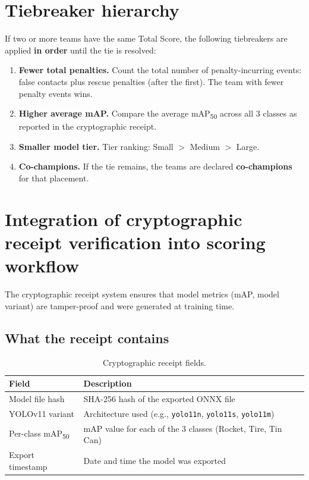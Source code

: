 \documentclass[a4]{article}
\begin{document}
\section*{Tiebreaker hierarchy}
If two or more teams have the same Total Score, the following tiebreakers are applied \textbf{in order} until the tie is resolved:

\begin{enumerate}
    \item \textbf{Fewer total penalties.} Count the total number of penalty-incurring events: false contacts plus rescue penalties (after the first). The team with fewer penalty events wins.

    \item \textbf{Higher average mAP.} Compare the average mAP\textsubscript{50} across all 3 classes as reported in the cryptographic receipt.

    \item \textbf{Smaller model tier.} Tier ranking: Small $>$ Medium $>$ Large.

    \item \textbf{Co-champions.} If the tie remains, the teams are declared \textbf{co-champions} for that placement.
\end{enumerate}

\section*{Integration of cryptographic receipt verification into scoring workflow}
The cryptographic receipt system ensures that model metrics (mAP, model variant) are tamper-proof and were generated at training time.

\subsection*{What the receipt contains}

\begin{table}[H]
\centering
\begin{tabular}{ll}
\toprule
\textbf{Field} & \textbf{Description} \\
\midrule
Model file hash & SHA-256 hash of the exported ONNX file \\
YOLOv11 variant & Architecture used (e.g., \texttt{yolo11n}, \texttt{yolo11s}, \texttt{yolo11m}) \\
Per-class mAP\textsubscript{50} & mAP value for each of the 3 classes (Rocket, Tire, Tin Can) \\
Export timestamp & Date and time the model was exported \\
\bottomrule
\end{tabular}
\caption{Cryptographic receipt fields.}
\end{table}
\end{document}
